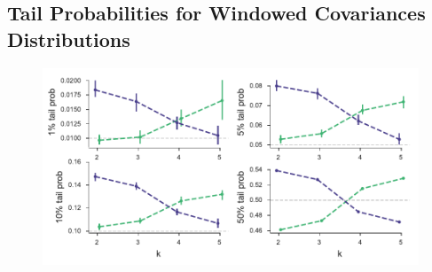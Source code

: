 \documentclass[11pt]{article}
\begin{document}
\subsection{\textcite{Barghi2019-qy} Tail Probabilities for Windowed Covariances Distributions}

\begin{figure}[!ht]
  \centering
  \includegraphics[]{figures/barghi-tailprobs-panels.pdf}

  \caption{ }
  \label{suppfig:barghi-tailprobs-panels}
\end{figure}
\end{document}
